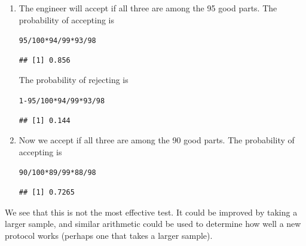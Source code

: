 \documentclass[twoside]{book}\usepackage[]{graphicx}\usepackage[]{xcolor}
\makeatletter
\newcommand{\hlnum}[1]{\textcolor[rgb]{0.686,0.059,0.569}{#1}}%
\newcommand{\hlopt}[1]{\textcolor[rgb]{0,0,0}{#1}}%
\newenvironment{kframe}{%
 \def\at@end@of@kframe{}%
 \ifinner\ifhmode%
  \def\at@end@of@kframe{\end{minipage}}%
  \begin{minipage}{\columnwidth}%
 \fi\fi%
 \def\FrameCommand##1{\hskip\@totalleftmargin \hskip-\fboxsep
 \colorbox{shadecolor}{##1}\hskip-\fboxsep
     \hskip-\linewidth \hskip-\@totalleftmargin \hskip\columnwidth}%
 \MakeFramed {\advance\hsize-\width
   \@totalleftmargin\z@ \linewidth\hsize
   \@setminipage}}%
 {\par\unskip\endMakeFramed%
 \at@end@of@kframe}
\newenvironment{knitrout}{}{} %
\makeatother
\begin{document}
\begin{solution}

\begin{enumerate}
\item The engineer will accept if all three are among the 95 good parts.
The probability of accepting is
\begin{knitrout}
\color{fgcolor}\begin{kframe}
\begin{alltt}
\hlnum{95}\hlopt{/}\hlnum{100} \hlopt{*} \hlnum{94}\hlopt{/}\hlnum{99} \hlopt{*} \hlnum{93}\hlopt{/}\hlnum{98}
\end{alltt}
\begin{verbatim}
## [1] 0.856
\end{verbatim}
\end{kframe}
\end{knitrout}
The probability of rejecting is 
\begin{knitrout}
\color{fgcolor}\begin{kframe}
\begin{alltt}
\hlnum{1} \hlopt{-} \hlnum{95}\hlopt{/}\hlnum{100} \hlopt{*} \hlnum{94}\hlopt{/}\hlnum{99} \hlopt{*} \hlnum{93}\hlopt{/}\hlnum{98}
\end{alltt}
\begin{verbatim}
## [1] 0.144
\end{verbatim}
\end{kframe}
\end{knitrout}

\item
Now we accept if all three are among the 90 good parts. 
The probability of accepting is
\begin{knitrout}
\color{fgcolor}\begin{kframe}
\begin{alltt}
\hlnum{90}\hlopt{/}\hlnum{100} \hlopt{*} \hlnum{89}\hlopt{/}\hlnum{99} \hlopt{*} \hlnum{88}\hlopt{/}\hlnum{98}
\end{alltt}
\begin{verbatim}
## [1] 0.7265
\end{verbatim}
\end{kframe}
\end{knitrout}
\end{enumerate}
We see that this is not the most effective test.  It could be improved by taking 
a larger sample, and similar arithmetic could be used to determine how well a 
new protocol works (perhaps one that takes a larger sample).
\end{solution}
\end{document}
